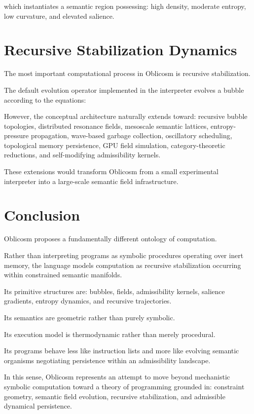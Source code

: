 \documentclass[11pt]{article}
\begin{document}
which instantiates a semantic region possessing:
high density,
moderate entropy,
low curvature,
and elevated salience.

\section{Recursive Stabilization Dynamics}

The most important computational process in Oblicosm is recursive stabilization.

The default evolution operator implemented in the interpreter evolves a bubble according to the equations:

However, the conceptual architecture naturally extends toward:
recursive bubble topologies,
distributed resonance fields,
mesoscale semantic lattices,
entropy-pressure propagation,
wave-based garbage collection,
oscillatory scheduling,
topological memory persistence,
GPU field simulation,
category-theoretic reductions,
and self-modifying admissibility kernels.

These extensions would transform Oblicosm from a small experimental interpreter into a large-scale semantic field infrastructure.

\section{Conclusion}

Oblicosm proposes a fundamentally different ontology of computation.

Rather than interpreting programs as symbolic procedures operating over inert memory, the language models computation as recursive stabilization occurring within constrained semantic manifolds.

Its primitive structures are:
bubbles,
fields,
admissibility kernels,
salience gradients,
entropy dynamics,
and recursive trajectories.

Its semantics are geometric rather than purely symbolic.

Its execution model is thermodynamic rather than merely procedural.

Its programs behave less like instruction lists and more like evolving semantic organisms negotiating persistence within an admissibility landscape.

In this sense, Oblicosm represents an attempt to move beyond mechanistic symbolic computation toward a theory of programming grounded in:
constraint geometry,
semantic field evolution,
recursive stabilization,
and admissible dynamical persistence.
\end{document}
